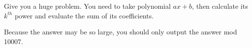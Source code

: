 Give you a huge problem. You need to take polynomial $ax+b$, then calculate its $k^{th}$ power and evaluate the sum of its coefficients.

Because the answer may be so large, you should only output the answer mod 10007.